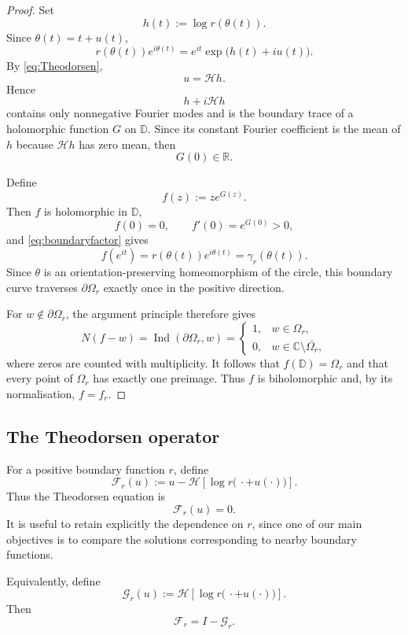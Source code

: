 \documentclass[11pt,a4paper]{amsart}
\begin{document}
\begin{proof}
	Set
	\[
	h(t):=\log r(\theta(t)).
	\]
	Since $\theta(t)=t+u(t)$,
	\begin{equation}\label{eq:boundaryfactor}
		r(\theta(t))e^{i\theta(t)}
		=
		e^{it}\exp\bigl(h(t)+iu(t)\bigr).
	\end{equation}
	By \eqref{eq:Theodorsen},
	\[
	u=\mathcal Hh.
	\]
	Hence
	\[
	h+i\mathcal Hh
	\]
	contains only nonnegative Fourier modes and is the boundary trace of
	a holomorphic function $G$ on $\mathbb D$. Since its constant Fourier
	coefficient is the mean of $h$ because \(\mathcal Hh\) has zero mean, then
	\[
	G(0)\in\mathbb R.
	\]
	
	Define
	\[
	f(z):=z e^{G(z)}.
	\]
	Then $f$ is holomorphic in $\mathbb D$,
	\[
	f(0)=0,
	\qquad
	f'(0)=e^{G(0)}>0,
	\]
	and \eqref{eq:boundaryfactor} gives
	\[
	f(e^{it})
	=
	r(\theta(t))e^{i\theta(t)}
	=
	\gamma_r(\theta(t)).
	\]
	Since $\theta$ is an orientation-preserving homeomorphism of the
	circle, this boundary curve traverses $\partial\Omega_r$ exactly once
	in the positive direction.
	
	For $w\notin\partial\Omega_r$, the argument principle therefore gives
	\[
	N(f-w)
	=
	\operatorname{Ind}(\partial\Omega_r,w)
	=
	\begin{cases}
		1,&w\in\Omega_r,\\
		0,&w\in\mathbb C\setminus\overline{\Omega_r},
	\end{cases}
	\]
	where zeros are counted with multiplicity. It follows that
	$f(\mathbb D)=\Omega_r$ and that every point of $\Omega_r$ has exactly
	one preimage. Thus $f$ is biholomorphic and, by its normalisation,
	$f=f_r$.
\end{proof}


\subsection{The Theodorsen operator}

For a positive boundary function $r$, define
\begin{equation}\label{eq:Fr}
	\mathcal F_r(u)
	:=
	u
	-
	\mathcal H
	\left[
	\log r\bigl(\,\cdot+u(\cdot)\bigr)
	\right].
\end{equation}
Thus the Theodorsen equation is
\[
\mathcal F_r(u)=0.
\]
It is useful to retain explicitly the dependence on $r$, since one of
our main objectives is to compare the solutions corresponding to
nearby boundary functions.

Equivalently, define
\begin{equation}\label{eq:GTheodorsen}
	\mathcal G_r(u)
	:=
	\mathcal H
	\left[
	\log r\bigl(\,\cdot+u(\cdot)\bigr)
	\right].
\end{equation}
Then
\[
\mathcal F_r=I-\mathcal G_r.
\]
\end{document}
